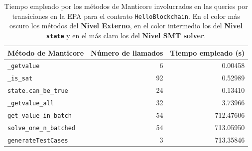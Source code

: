 \begin{table}[ht]
    \centering
    \begin{tabular}{l @{\hskip 30pt} r @{\hskip 30pt} r}
        \toprule
        \textbf{Método de Manticore}                      & \textbf{Número de llamados} & \textbf{Tiempo empleado (s)} \\
        \midrule
        \rowcolor{color1} \texttt{\_getvalue}             & 6                           & 0.00458                      \\
        \rowcolor{color1} \texttt{\_is\_sat}              & 92                          & 0.52989                      \\
        \rowcolor{color2} \texttt{state.can\_be\_true}    & 24                          & 0.13410                      \\
        \rowcolor{color1} \texttt{\_getvalue\_all}        & 32                          & 3.73966                      \\
        \rowcolor{color2} \texttt{get\_value\_in\_batch}  & 54                          & 712.47606                    \\
        \rowcolor{color2} \texttt{solve\_one\_n\_batched} & 54                          & 713.05950                    \\
        \rowcolor{color3} \texttt{generateTestCases}      & 3                           & 713.35846                    \\
        \bottomrule
    \end{tabular}
    \caption{Tiempo empleado por los métodos de Manticore involucrados en las queries por transiciones en la EPA para el contrato \texttt{HelloBlockchain}. En el color más oscuro los métodos del \textbf{Nivel Externo}, en el color intermedio los del \textbf{Nivel \texttt{state}} y en el más claro los del \textbf{Nivel SMT solver}.}
    \label{tab:performance}
\end{table}
